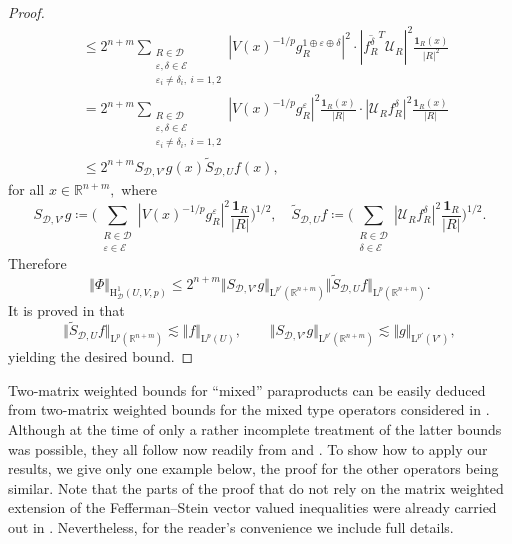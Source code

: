 \documentclass{article}
\theoremstyle{definition}
\theoremstyle{remark}
\numberwithin{equation}{section}
\newcommand{\cE}{\mathcal{E}}
\newcommand{\cU}{\mathcal{U}}
\newcommand{\bfD}{\bm{\mathcal{D}}}
\newcommand{\e}{\varepsilon}
\newcommand{\reals}{\mathbb{R}}
\newcommand{\Lp}[1]{\mathrm{L}^{#1}}
\newcommand{\1}{\mathbf{1}}
\begin{document}
\begin{proof}
\begin{align*}
            &\leq 2^{n+m}\sum_{\substack{R\in\bfD\\\e,\delta\in\cE\\\e_i\neq\delta_i,~i=1,2}}|V(x)^{-1/p} g_{R}^{1\oplus\e\oplus\delta}|^2\cdot|\overline{f_{R}^{\delta}}^{T}\cU_{R}|^2\frac{\1_{R}(x)}{|R|^2}\\
            &=2^{n+m}\sum_{\substack{R\in\bfD\\\e,\delta\in\cE\\\e_i\neq\delta_i,~i=1,2}}|V(x)^{-1/p} g_{R}^{\e}|^2\frac{\1_{R}(x)}{|R|}\cdot|\cU_{R}f_{R}^{\delta}|^2\frac{\1_{R}(x)}{|R|}\\
            &\leq2^{n+m}S_{\bfD,V'}g(x)\widetilde{S}_{\bfD,U}f(x),
        \end{align*}
        for all $x\in\reals^{n+m},$ where
        \begin{equation*}
            S_{\bfD,V'}g\coloneq \bigg(\sum_{\substack{R\in\bfD\\\e\in\cE}}|V(x)^{-1/p}g_{R}^{\e}|^2\frac{\1_{R}}{|R|}\bigg)^{1/2},\quad\widetilde{S}_{\bfD,U}f\coloneq \bigg(\sum_{\substack{R\in\bfD\\\delta\in\cE}}|\cU_{R}f_{R}^{\delta}|^2\frac{\1_{R}}{|R|}\bigg)^{1/2}.
        \end{equation*}
        Therefore
        \begin{equation*}
            \Vert\Phi\Vert_{\mathrm{H}^1_{\bfD}(U,V,p)}\leq 2^{n+m}\Vert S_{\bfD,V'}g\Vert_{\Lp{p'}(\reals^{n+m})}\Vert\widetilde{S}_{\bfD,U}f\Vert_{\Lp{p}(\reals^{n+m})}.
        \end{equation*}
        It is proved in \cite[Lemma 5.2 and Corollary 5.4]{DKPS2024} that
        \begin{equation*}
            \Vert\widetilde{S}_{\bfD,U}f\Vert_{\Lp{p}(\reals^{n+m})}\lesssim\Vert f\Vert_{\Lp{p}(U)},\qquad \Vert S_{\bfD,V'}g\Vert_{\Lp{p'}(\reals^{n+m})}\lesssim\Vert g\Vert_{\Lp{p'}(V')},
        \end{equation*}
        yielding the desired bound.
    \end{proof}

    Two-matrix weighted bounds for ``mixed'' paraproducts can be easily deduced from two-matrix weighted bounds for the mixed type operators considered in \cite[Section 8]{DKPS2024}.
    Although at the time of \cite{DKPS2024} only a rather incomplete treatment of the latter bounds was possible, they all follow now readily from  and .
    To show how to apply our results, we give only one example below, the proof for the other operators being similar.
    Note that the parts of the proof that do not rely on the matrix weighted extension of the Fefferman--Stein vector valued inequalities were already carried out in \cite[Section 8]{DKPS2024}.
    Nevertheless, for the reader's convenience we include full details.
    
\end{document}
